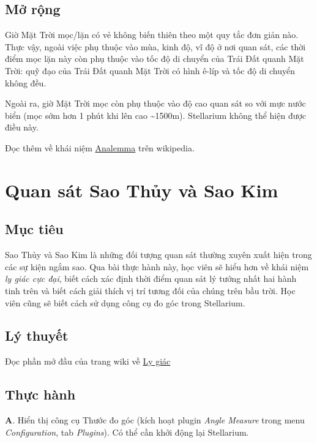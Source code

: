 \documentclass[
  a4paper,
]{book}
\begin{document}
\section{Mở rộng}\label{mux1edf-rux1ed9ng}

Giờ Mặt Trời mọc/lặn có vẻ không biến thiên theo một quy tắc đơn giản nào. Thực vậy, ngoài việc phụ thuộc vào mùa, kinh độ, vĩ độ ở nơi quan sát, các thời điểm mọc lặn này còn phụ thuộc vào tốc độ di chuyển của Trái Đất quanh Mặt Trời: quỹ đạo của Trái Đất quanh Mặt Trời có hình ê-líp và tốc độ di chuyển không đều.

Ngoài ra, giờ Mặt Trời mọc còn phụ thuộc vào độ cao quan sát so với mực nước biển (mọc sớm hơn 1 phút khi lên cao \textasciitilde1500m). Stellarium không thể hiện được điều này.

Đọc thêm về khái niệm \href{https://en.wikipedia.org/wiki/Analemma}{Analemma} trên wikipedia.

\chapter{Quan sát Sao Thủy và Sao Kim}\label{quan-suxe1t-sao-thux1ee7y-vuxe0-sao-kim}

\section{Mục tiêu}\label{mux1ee5c-tiuxeau-2}

Sao Thủy và Sao Kim là những đối tượng quan sát thường xuyên xuất hiện trong các sự kiện ngắm sao. Qua bài thực hành này, học viên sẽ hiểu hơn về khái niệm \emph{ly giác cực đại}, biết cách xác định thời điểm quan sát lý tưởng nhất hai hành tinh trên và biết cách giải thích vị trí tương đối của chúng trên bầu trời. Học viên cũng sẽ biết cách sử dụng công cụ đo góc trong Stellarium.

\section{Lý thuyết}\label{luxfd-thuyux1ebft-1}

Đọc phần mở đầu của trang wiki về \href{https://vi.wikipedia.org/wiki/Ly_gi\%C3\%A1c_(thi\%C3\%AAn_v\%C4\%83n_h\%E1\%BB\%8Dc)}{Ly giác}

\section{Thực hành}\label{thux1ef1c-huxe0nh-2}

\textbf{A}. Hiển thị công cụ Thước đo góc (kích hoạt plugin \emph{Angle Measure} trong menu \emph{Configuration}, tab \emph{Plugins}). Có thể cần khởi động lại Stellarium.
\end{document}
